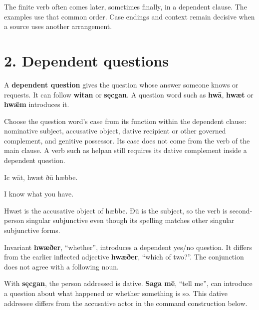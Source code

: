 The finite verb often comes later, sometimes finally, in a dependent clause. The examples use that common order. Case endings and context remain decisive when a source uses another arrangement.

\section*{2. Dependent questions}

A \textbf{dependent question} gives the question whose answer someone knows or requests. It can follow \textbf{witan} or \textbf{sęcgan}. A question word such as \textbf{hwā}, \textbf{hwæt} or \textbf{hwǣm} introduces it.

Choose the question word’s case from its function within the dependent clause: nominative subject, accusative object, dative recipient or other governed complement, and genitive possessor. Its case does not come from the verb of the main clause. A verb such as helpan still requires its dative complement inside a dependent question.

Ic wāt, hwæt ðū hæbbe.

I know what you have.

Hwæt is the accusative object of hæbbe. Ðū is the subject, so the verb is second-person singular subjunctive even though its spelling matches other singular subjunctive forms.

Invariant \textbf{hwæðer}, “whether”, introduces a dependent yes/\allowbreak{}no question. It differs from the earlier inflected adjective \textbf{hwæðer}, “which of two?”. The conjunction does not agree with a following noun.

With \textbf{sęcgan}, the person addressed is dative. \textbf{Saga mē}, “tell me”, can introduce a question about what happened or whether something is so. This dative addressee differs from the accusative actor in the command construction below.

